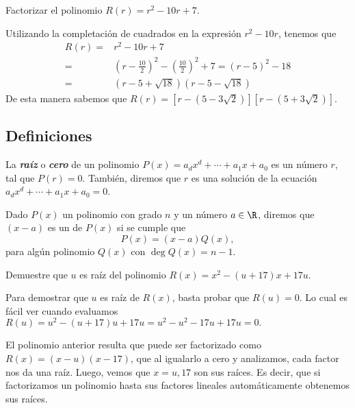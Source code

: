 \begin{example}
    Factorizar el polinomio $R(r) = r^2 - 10r + 7$.
\end{example}
\begin{solution}
    Utilizando la completación de cuadrados en la expresión $r^2 - 10r$, tenemos que
    \begin{align*}
        R(r) =& r^2 - 10r + 7\\
        =& \left( r - \frac{10}{2} \right)^2 - \left( \frac{10}{2} \right)^2 + 7
        = \left( r - 5 \right)^2 - 18\\
        =& \left( r - 5 + \sqrt {18} \right)\left( r - 5 - \sqrt {18} \right)
    \end{align*}
    De esta manera sabemos que $R(r) = \left[ r - \left( 5 - 3\sqrt {2} \right)\right]\left[ r - \left( 5 + 3\sqrt {2} \right)\right]$.
\end{solution}


\subsection{Definiciones}

\begin{definition}
    La \textbf{\emph{raíz}} o \textbf{\emph{cero}} de un polinomio $P(x) = a_d x^d + \cdots + a_1 x + a_0$ es un número $r$, tal que $P(r) = 0$.
    También, diremos que $r$ es una solución de la ecuación $ a_d x^d + \cdots + a_1 x + a_0 = 0$.
\end{definition}

\begin{definition}
    Dado $P(x)$ un polinomio con grado $n$ y un número $a \in \R$, diremos que $(x - a)$ es un  de $P(x)$ si se cumple que
    \[
        P(x) = (x - a)Q(x),
    \]
    para algún polinomio $Q(x)$ con $\deg Q(x) = n - 1$.
\end{definition}

\begin{example}
    Demuestre que $u$ es raíz del polinomio $R(x) = x^2 - (u + 17) x + 17u$.
\end{example}
\begin{solution}
    Para demostrar que $u$ es raíz de $R(x)$, basta probar que $R(u) = 0$.
    Lo cual es fácil ver cuando evaluamos $R(u) = u^2 - (u+17)u + 17u = u^2 - u^2 - 17u + 17u = 0.$
\end{solution}

El polinomio anterior resulta que puede ser factorizado como $R(x) = (x - u)(x - 17)$, que al igualarlo a cero y analizamos, cada factor nos da una raíz.
Luego, vemos que $x = u, 17$ son sus raíces.
Es decir, que si factorizamos un polinomio hasta sus factores lineales automáticamente obtenemos sus raíces.

